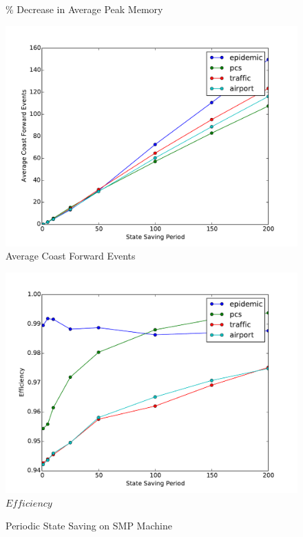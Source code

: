 \documentclass[11pt]{book}
\begin{document}
\begin{figure}
\begin{minipage}{.5\textwidth}
\begin{center}
      \% Decrease in Average Peak Memory \\
    \end{center}
  \end{minipage}
  \begin{minipage}{.5\textwidth}
    \begin{center}
      \includegraphics[width=\textwidth,keepaspectratio,quiet]{figs/state_saving/bc/average_cf.pdf} \\
      Average Coast Forward Events
    \end{center}
  \end{minipage}%
  \hfill
  \begin{minipage}{.5\textwidth}
    \begin{center}
      \includegraphics[width=\textwidth,keepaspectratio,quiet]{figs/state_saving/bc/efficiency.pdf} \\
      $Efficiency$ \\
    \end{center}
  \end{minipage}
  \caption{Periodic State Saving on SMP Machine}\label{ssp_analysis_smp}
\end{figure}
\end{document}
